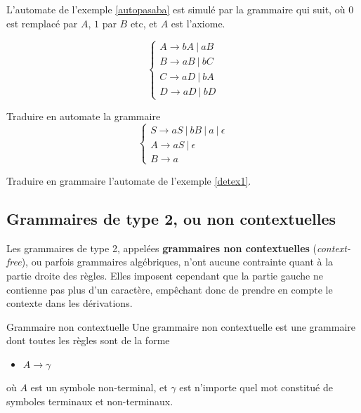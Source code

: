 \begin{example}
L'automate de l'exemple \ref{autopasaba} est simulé par la grammaire qui suit, où $0$ est remplacé par $A$, $1$ par $B$ etc, et $A$ est l'axiome.

\[
\begin{cases}
A \rightarrow bA~|~aB \\
B \rightarrow aB~|~bC \\
C \rightarrow aD~|~bA \\
D \rightarrow aD~|~bD
\end{cases}
\]

\end{example}

\begin{exercice}
Traduire en automate la grammaire 
\[
\begin{cases}
S \rightarrow aS~|~bB~|~a~|~\epsilon \\
A \rightarrow aS~|~\epsilon \\
B \rightarrow a
\end{cases}
\]

\end{exercice}

\begin{exercice}
Traduire en grammaire l'automate de l'exemple \ref{detex1}.
\end{exercice}



\subsection{Grammaires de type 2, ou non contextuelles}

Les grammaires de type 2, appelées \textbf{grammaires non contextuelles} (\textit{context-free}), ou parfois grammaires algébriques, n'ont aucune contrainte quant à la partie droite des règles. Elles imposent cependant que la partie gauche ne contienne pas plus d'un caractère, empêchant donc de prendre en compte le contexte dans les dérivations.

\begin{definition}{Grammaire non contextuelle}{}
Une grammaire non contextuelle est une grammaire dont toutes les règles sont de la forme 
\begin{itemize}
\item[] $A \rightarrow \gamma$
\end{itemize}
où $A$ est un symbole non-terminal, et $\gamma$ est n'importe quel mot constitué de symboles terminaux et non-terminaux.
\end{definition}

